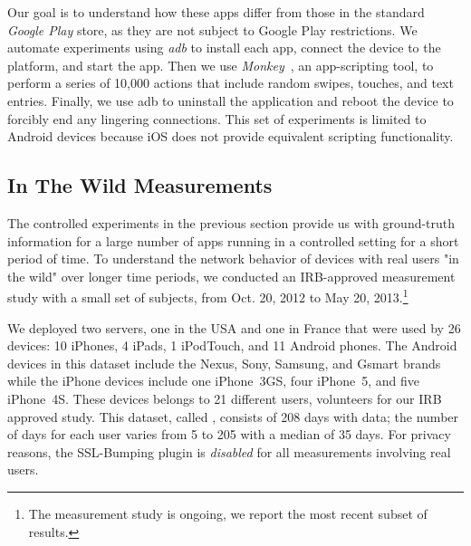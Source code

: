 Our goal is to understand how these apps differ from those in the standard \emph{Google Play} 
store, as they are not subject to Google Play restrictions.
We automate experiments using \emph{adb} to
install each app, connect the device to the \platname{} platform, and
start the app. Then we use \emph{Monkey}~\cite{adbmonkey}, an app-scripting 
tool, to perform a series of 10,000 actions  that include
random swipes, touches, and text entries.  Finally, we use adb to
uninstall the application and reboot the device to forcibly end any
lingering connections. This set of experiments is limited to
Android devices because iOS does not provide equivalent 
scripting functionality. 


\subsection{In The Wild Measurements}
\label{sec:dataset-wild-measurements}

The controlled experiments in the previous section provide us with 
ground-truth information for a large number of apps running in a controlled 
setting for a short period of time. To understand the network behavior of 
devices with real users "in the wild" over longer time periods, we conducted 
an IRB-approved measurement study with a small set of subjects, from 
Oct. 20, 2012 to May 20, 2013.\footnote{The measurement study is ongoing, we report the most recent subset of results.}

We deployed two \platname servers, one in the USA and one in France
that were used by 26 devices: 10 iPhones, 4 iPads, 1 iPodTouch, and 11
Android phones.  The Android devices in this dataset include the
Nexus, Sony, Samsung, and Gsmart brands while the iPhone devices
include one iPhone~3GS, four iPhone~5, and five iPhone~4S.  These
devices belongs to 21 different users, volunteers for our IRB approved
study.  This dataset, called \mobWild, consists of 208 days with data; the number of 
days for each user varies from 5 to 205 with a median of 35 days.  For privacy reasons, the
SSL-Bumping plugin is \emph{disabled} for all measurements involving
real users.

